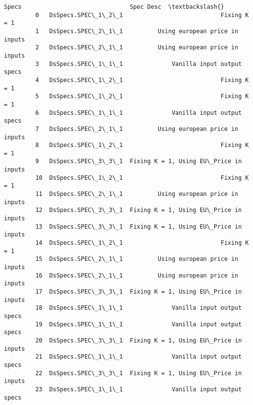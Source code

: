 \documentclass[11pt]{article}
\begin{document}
\begin{Verbatim}[commandchars=\\\{\}]
                          Specs                               Spec Desc  \textbackslash{}
         0   DsSpecs.SPEC\_1\_2\_1                            Fixing K = 1   
         1   DsSpecs.SPEC\_2\_1\_1          Using european price in inputs   
         2   DsSpecs.SPEC\_2\_1\_1          Using european price in inputs   
         3   DsSpecs.SPEC\_1\_1\_1              Vanilla input output specs   
         4   DsSpecs.SPEC\_1\_2\_1                            Fixing K = 1   
         5   DsSpecs.SPEC\_1\_2\_1                            Fixing K = 1   
         6   DsSpecs.SPEC\_1\_1\_1              Vanilla input output specs   
         7   DsSpecs.SPEC\_2\_1\_1          Using european price in inputs   
         8   DsSpecs.SPEC\_1\_2\_1                            Fixing K = 1   
         9   DsSpecs.SPEC\_3\_3\_1  Fixing K = 1, Using EU\_Price in inputs   
         10  DsSpecs.SPEC\_1\_2\_1                            Fixing K = 1   
         11  DsSpecs.SPEC\_2\_1\_1          Using european price in inputs   
         12  DsSpecs.SPEC\_3\_3\_1  Fixing K = 1, Using EU\_Price in inputs   
         13  DsSpecs.SPEC\_3\_3\_1  Fixing K = 1, Using EU\_Price in inputs   
         14  DsSpecs.SPEC\_1\_2\_1                            Fixing K = 1   
         15  DsSpecs.SPEC\_2\_1\_1          Using european price in inputs   
         16  DsSpecs.SPEC\_2\_1\_1          Using european price in inputs   
         17  DsSpecs.SPEC\_3\_3\_1  Fixing K = 1, Using EU\_Price in inputs   
         18  DsSpecs.SPEC\_1\_1\_1              Vanilla input output specs   
         19  DsSpecs.SPEC\_1\_1\_1              Vanilla input output specs   
         20  DsSpecs.SPEC\_3\_3\_1  Fixing K = 1, Using EU\_Price in inputs   
         21  DsSpecs.SPEC\_1\_1\_1              Vanilla input output specs   
         22  DsSpecs.SPEC\_3\_3\_1  Fixing K = 1, Using EU\_Price in inputs   
         23  DsSpecs.SPEC\_1\_1\_1              Vanilla input output specs   
         

\end{Verbatim}
\end{document}
